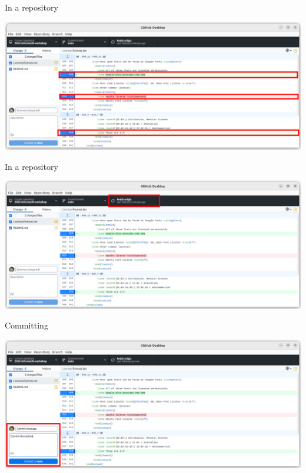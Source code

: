 \documentclass[compress,aspectratio=169]{beamer}
\begin{document}
  \begin{frame}[noframenumbering]{In a repository}
    \begin{center}
      \includegraphics[height=0.75\textheight]{./assets/GH_01_03.png}
    \end{center}
  \end{frame}
  \begin{frame}[noframenumbering]{In a repository}
    \begin{center}
      \includegraphics[height=0.75\textheight]{./assets/GH_01_04.png}
    \end{center}
  \end{frame}

  \begin{frame}{Committing}
    \begin{center}
      \includegraphics[height=0.75\textheight]{./assets/GH_02.png}
    \end{center}
  \end{frame}
\end{document}
